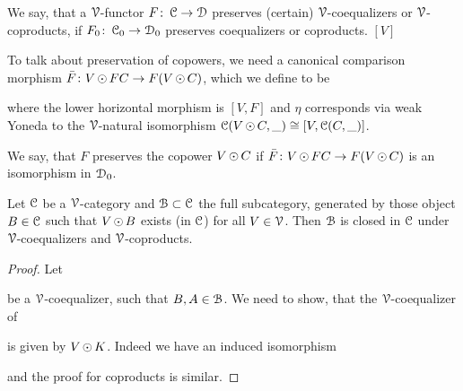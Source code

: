 \documentclass[a4paper,11pt,oneside,openany]{scrbook}
\begin{document}
\begin{defn}
	We say, that a $\V$-functor $F \from \C \to \D$ preserves (certain) $\V$-coequalizers or $\V$-coproducts, if $F_{0} \from \C_{0} \to \D_{0}$ preserves
	coequalizers or coproducts. $[V]$
\end{defn}

To talk about preservation of copowers, we need a canonical comparison morphism $\bar{F} \from V\copw FC \to F(V\copw C)$, which we define to be
\begin{center}
\end{center}
where the lower horizontal morphism is $[V,F]$ and $\eta$ corresponds via weak Yoneda to the $\V$-natural isomorphism $\C(V\copw C,\_) \iso [V,\C(C,\_)]$.

\begin{defn}
	We say, that $F$ preserves the copower $V \copw C$ if $\bar{F} \from V \copw FC \to F(V \copw C)$ is an isomorphism in $\D_{0}$.
\end{defn}

\begin{lemma}
	Let $\C$ be a $\V$-category and $\B \subset \C$ the full subcategory, generated by those object $B \in \C$ such that $V \copw B$ exists (in $\C$) for all
	$V \in \V$. Then $\B$ is closed in $\C$ under $\V$-coequalizers and $\V$-coproducts.
\end{lemma}

\begin{proof}
	Let
	\begin{center}
	\end{center}
	be a $\V$-coequalizer, such that $B,A \in \B$. We need to show, that the $\V$-coequalizer of
	\begin{center}
	\end{center}
	is given by $V \copw K$. Indeed we have an induced isomorphism
	\begin{center}
	\end{center}
	and the proof for coproducts is similar.
\end{proof}
\end{document}
